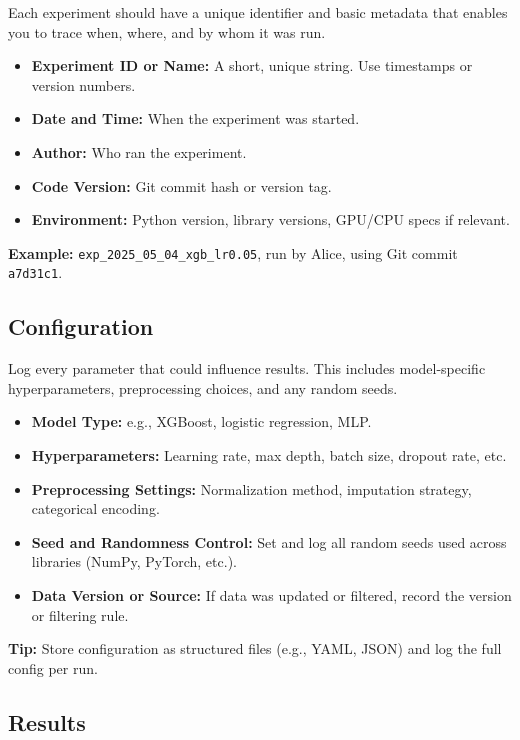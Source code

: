 \documentclass[12pt,openany]{book}
\begin{document}
Each experiment should have a unique identifier and basic metadata that enables you to trace when, where, and by whom it was run.

\begin{itemize}
    \item \textbf{Experiment ID or Name:} A short, unique string. Use timestamps or version numbers.
    \item \textbf{Date and Time:} When the experiment was started.
    \item \textbf{Author:} Who ran the experiment.
    \item \textbf{Code Version:} Git commit hash or version tag.
    \item \textbf{Environment:} Python version, library versions, GPU/CPU specs if relevant.
\end{itemize}

\textbf{Example:} \texttt{exp\_2025\_05\_04\_xgb\_lr0.05}, run by Alice, using Git commit \texttt{a7d31c1}.

\subsection{Configuration}

Log every parameter that could influence results. This includes model-specific hyperparameters, preprocessing choices, and any random seeds.

\begin{itemize}
    \item \textbf{Model Type:} e.g., XGBoost, logistic regression, MLP.
    \item \textbf{Hyperparameters:} Learning rate, max depth, batch size, dropout rate, etc.
    \item \textbf{Preprocessing Settings:} Normalization method, imputation strategy, categorical encoding.
    \item \textbf{Seed and Randomness Control:} Set and log all random seeds used across libraries (NumPy, PyTorch, etc.).
    \item \textbf{Data Version or Source:} If data was updated or filtered, record the version or filtering rule.
\end{itemize}

\textbf{Tip:} Store configuration as structured files (e.g., YAML, JSON) and log the full config per run.

\subsection{Results}
\end{document}

